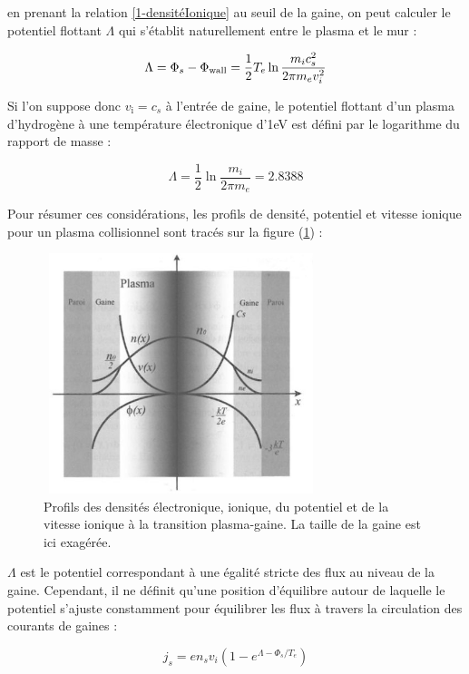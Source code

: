 \begin{refsection}
en prenant la relation \ref{1-densitéIonique} au seuil de la gaine, on peut
calculer le potentiel flottant $\Lambda$ qui s'établit naturellement entre le
plasma et le mur :

\begin{equation}
	\Lambda=\Phi_{s}-\Phi_\text{wall}=\frac{1}{2}T_{e}\ln{\frac{m_{i}c_{s}^2}{2\pi
	m_{e}v_{i}^{{2}}}}
	\end{equation}

Si l'on suppose donc $v_\text{i}=c_{s}$ à l'entrée de gaine, le potentiel
flottant d'un plasma d'hydrogène à une température électronique d'1eV est
défini par le logarithme du rapport de masse :

\begin{equation}
	\Lambda=\frac{1}{2}\ln{\frac{m_{i}}{2\pi
	m_{e}}}=2.8388
	\end{equation}

Pour résumer ces considérations, les profils de densité,
potentiel et vitesse ionique pour un plasma collisionnel sont tracés sur la
figure (\ref{1-profilesgaine}) :
	
\begin{figure}[htbp]
\centering
\includegraphics[height=70mm,width=80mm]{figures/1-sheathprofiles.jpg}{\caption{Profils
des densités électronique, ionique,
du potentiel et de la vitesse ionique à
la transition plasma-gaine\parencite{Rax}. La taille
de la gaine est ici exagérée.}\label{1-profilesgaine}}
\end{figure}

$\Lambda$ est le potentiel correspondant à une égalité stricte des flux au
niveau de la gaine. Cependant, il ne définit qu'une position
d'équilibre autour de laquelle le potentiel s'ajuste constamment pour
équilibrer les flux à travers la circulation des courants de gaines :

\begin{equation}
	j_{s}=en_{s}v_{i}\left(1-e^{\Lambda-\Phi_{s}/T_{e}}\right)
\end{equation}


\end{refsection}
